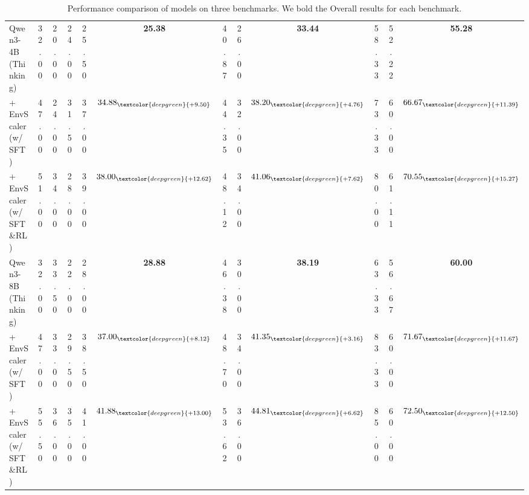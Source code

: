 \begin{table}[t]
\begin{tabular}{lccccccccccc}
Qwen3-4B (Thinking) & 32.00 & 20.00 & 24.00 & 25.50 & \textbf{25.38} & 40.87 & 26.00 & \textbf{33.44} & 58.33 & 52.22 & \textbf{55.28}  \\
\rowcolor{lightblue}\quad + EnvScaler (w/ SFT)
& 47.00 & 24.00 & 31.50 & 37.00 & \textbf{$\text{34.88}_{\textcolor{deepgreen}{\text{+9.50}}}$}
& 44.35 & 32.00 & \textbf{$\text{38.20}_{\textcolor{deepgreen}{\text{+4.76}}}$}
& 73.33 & 60.00 & \textbf{$\text{66.67}_{\textcolor{deepgreen}{\text{+11.39}}}$}  \\
\rowcolor{lightblue}\quad + EnvScaler (w/ SFT\&RL)
& 51.00 & 34.00 & 28.00 & 39.00 & \textbf{$\text{38.00}_{\textcolor{deepgreen}{\text{+12.62}}}$}
& 48.12 & 34.00 & \textbf{$\text{41.06}_{\textcolor{deepgreen}{\text{+7.62}}}$}
& 80.00 & 61.11 & \textbf{$\text{70.55}_{\textcolor{deepgreen}{\text{+15.27}}}$}  \\
\midrule
Qwen3-8B (Thinking) & 32.00 & 33.50 & 22.00 & 28.00 & \textbf{28.88} & 46.38 & 30.00 & \textbf{38.19} & 63.33 & 56.67 & \textbf{60.00}  \\
\rowcolor{lightblue}\quad + EnvScaler (w/ SFT)
& 47.00 & 33.00 & 29.50 & 38.50 & \textbf{$\text{37.00}_{\textcolor{deepgreen}{\text{+8.12}}}$}
& 48.70 & 34.00 & \textbf{$\text{41.35}_{\textcolor{deepgreen}{\text{+3.16}}}$}
& 83.33 & 60.00 & \textbf{$\text{71.67}_{\textcolor{deepgreen}{\text{+11.67}}}$}  \\
\rowcolor{lightblue}\quad + EnvScaler (w/ SFT\&RL)
& 55.50 & 36.00 & 35.00 & 41.00 & \textbf{$\text{41.88}_{\textcolor{deepgreen}{\text{+13.00}}}$}
& 53.62 & 36.00 & \textbf{$\text{44.81}_{\textcolor{deepgreen}{\text{+6.62}}}$}
& 85.00 & 60.00 & \textbf{$\text{72.50}_{\textcolor{deepgreen}{\text{+12.50}}}$}  \\
\bottomrule
\end{tabular}
\caption{Performance comparison of models on three benchmarks. We bold the Overall results for each benchmark.}
\label{tab:main_results}
\end{table}

